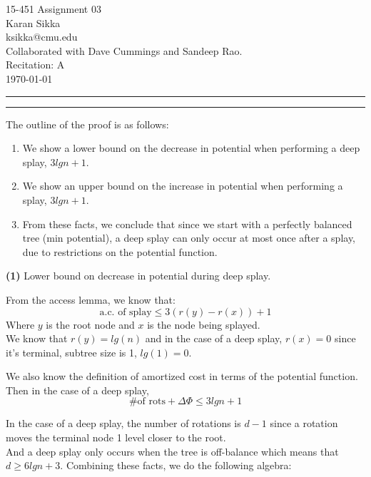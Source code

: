 \documentclass[11pt]{article}
\makeatletter
\newcommand{\question}[2] {\vspace{.25in} \hrule\vspace{0.5em}
\noindent{\bf #1: #2} \vspace{0.5em}
\hrule \vspace{.10in}}
\renewcommand{\part}[1] {\vspace{.10in} {\bf (#1)}}
\newcommand{\myname}{Karan Sikka}
\newcommand{\myandrew}{ksikka@cmu.edu}
\newcommand{\myhwnum}{03}
\makeatother
\begin{document}
\medskip

\thispagestyle{plain}
\begin{center}
{\Large 15-451 Assignment \myhwnum} \\
\myname \\
\myandrew \\
Collaborated with Dave Cummings and Sandeep Rao.\\
Recitation: A \\
\today \\
\end{center}

\question{1}{Balanced Splay Trees}

The outline of the proof is as follows:

\begin{enumerate}
\item We show a lower bound on the decrease in potential when performing a deep splay, $3 lg n + 1$.
\item We show an upper bound on the increase in potential when performing a splay, $3 lg n + 1$.
\item From these facts, we conclude that since we start with a perfectly balanced tree (min potential), a deep splay can only occur at most once after a splay, due to restrictions on the potential function.
\end{enumerate}

\part{1} Lower bound on decrease in potential during deep splay.

From the access lemma, we know that:
$$ \text{a.c. of splay} \leq 3 (r(y) - r(x)) + 1$$
Where $y$ is the root node and $x$ is the node being splayed.\\
We know that $r(y) = lg(n)$ and in the case of a deep splay, $r(x) = 0$ since it's terminal, subtree size is 1, $lg(1) = 0$.

We also know the definition of amortized cost in terms of the potential function. Then in the case of a deep splay,
$$ \text{\# of rots} + \Delta \Phi \leq 3 lg n + 1$$

In the case of a deep splay, the number of rotations is $d - 1$ since a rotation moves the terminal node 1 level closer to the root.\\
And a deep splay only occurs when the tree is off-balance which means that $d \geq 6 lg n + 3$. Combining these facts, we do the following algebra:
\end{document}
